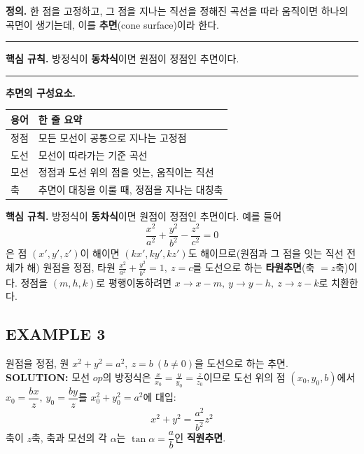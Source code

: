 \documentclass{article}
\theoremstyle{mystyle}
\begin{document}
\begin{tcolorbox}[
    colback=teal!4,
    colframe=teal!65!black,
    title=정의 \& 핵심 규칙,
    fonttitle=\bfseries,
    boxrule=0.5mm,
    arc=3mm
    ]
    \textbf{\textcolor{teal!65!black}{정의.}}\quad
    한 점을 고정하고, 그 점을 지나는 직선을 정해진 곡선을 따라 움직이면 하나의 곡면이 생기는데, 이를 \textbf{추면}(cone surface)이라 한다.

    \noindent\textcolor{teal!50!black}{\rule{\linewidth}{0.4pt}}

    \textbf{\textcolor{teal!65!black}{핵심 규칙.}}\quad
    방정식이 \textbf{동차식}이면 원점이 정점인 추면이다.

    \noindent\textcolor{teal!50!black}{\rule{\linewidth}{0.4pt}}

    \textbf{\textcolor{teal!65!black}{추면의 구성요소.}}
    \begin{center}
    \renewcommand{\arraystretch}{1.3}
    \begin{tabular}{|l|p{8.5cm}|}
    \hline
    \textbf{용어} & \textbf{한 줄 요약} \\
    \hline
    정점 & 모든 모선이 공통으로 지나는 고정점 \\
    \hline
    도선 & 모선이 따라가는 기준 곡선 \\
    \hline
    모선 & 정점과 도선 위의 점을 잇는, 움직이는 직선 \\
    \hline
    축 & 추면이 대칭을 이룰 때, 정점을 지나는 대칭축 \\
    \hline
    \end{tabular}
    \end{center}

    \textbf{\textcolor{teal!65!black}{핵심 규칙.}}\quad
    방정식이 \textbf{동차식}이면 원점이 정점인 추면이다. 예를 들어
    \[
    \frac{x^2}{a^2}+\frac{y^2}{b^2}-\frac{z^2}{c^2}=0
    \]
    은 점 \((x',y',z')\)이 해이면 \((kx',ky',kz')\)도 해이므로(원점과 그 점을 잇는 직선 전체가 해) 원점을 정점, 타원 \(\frac{x^2}{a^2}+\frac{y^2}{b^2}=1,\ z=c\)를 도선으로 하는 \textbf{타원추면}(축 \(=z\)축)이다. 정점을 \((m,h,k)\)로 평행이동하려면 \(x\to x-m,\ y\to y-h,\ z\to z-k\)로 치환한다.
\end{tcolorbox}

\subsection*{EXAMPLE 3}
원점을 정점, 원 \(x^2+y^2=a^2,\ z=b\ (b\ne0)\)을 도선으로 하는 추면.\\
\textbf{SOLUTION:} 모선 $op$의 방정식은 $\frac{x}{x_0}=\frac{y}{y_0}=\frac{z}{z_0}$이므로 도선 위의 점 \((x_0,y_0,b)\)에서 \(x_0=\dfrac{bx}{z},\ y_0=\dfrac{by}{z}\)를 \(x_0^2+y_0^2=a^2\)에 대입:
\[
x^2+y^2=\frac{a^2}{b^2}z^2
\]
축이 \(z\)축, 축과 모선의 각 \(\alpha\)는 \(\tan\alpha=\dfrac{a}{b}\)인 \textbf{직원추면}.
\end{document}
